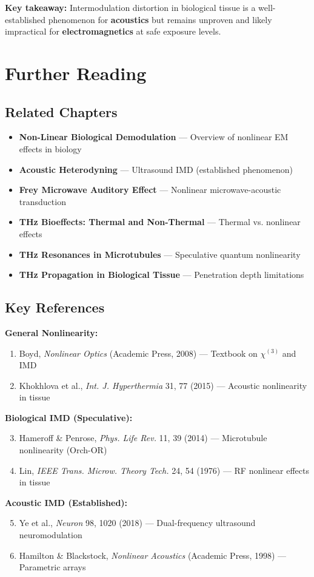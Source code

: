 \begin{keyconcept}
\textbf{Key takeaway:} Intermodulation distortion in biological tissue is a well-established phenomenon for \textbf{acoustics} but remains unproven and likely impractical for \textbf{electromagnetics} at safe exposure levels.
\end{keyconcept}

\section{Further Reading}

\subsection{Related Chapters}

\begin{itemize}
\item \textbf{Non-Linear Biological Demodulation} --- Overview of nonlinear EM effects in biology
\item \textbf{Acoustic Heterodyning} --- Ultrasound IMD (established phenomenon)
\item \textbf{Frey Microwave Auditory Effect} --- Nonlinear microwave-acoustic transduction
\item \textbf{THz Bioeffects: Thermal and Non-Thermal} --- Thermal vs. nonlinear effects
\item \textbf{THz Resonances in Microtubules} --- Speculative quantum nonlinearity
\item \textbf{THz Propagation in Biological Tissue} --- Penetration depth limitations
\end{itemize}

\subsection{Key References}

\textbf{General Nonlinearity:}
\begin{enumerate}
\item Boyd, \emph{Nonlinear Optics} (Academic Press, 2008) --- Textbook on $\chi^{(3)}$ and IMD
\item Khokhlova et al., \emph{Int. J. Hyperthermia} 31, 77 (2015) --- Acoustic nonlinearity in tissue
\end{enumerate}

\textbf{Biological IMD (Speculative):}
\begin{enumerate}
\setcounter{enumi}{2}
\item Hameroff \& Penrose, \emph{Phys. Life Rev.} 11, 39 (2014) --- Microtubule nonlinearity (Orch-OR)
\item Lin, \emph{IEEE Trans. Microw. Theory Tech.} 24, 54 (1976) --- RF nonlinear effects in tissue
\end{enumerate}

\textbf{Acoustic IMD (Established):}
\begin{enumerate}
\setcounter{enumi}{4}
\item Ye et al., \emph{Neuron} 98, 1020 (2018) --- Dual-frequency ultrasound neuromodulation
\item Hamilton \& Blackstock, \emph{Nonlinear Acoustics} (Academic Press, 1998) --- Parametric arrays
\end{enumerate}
